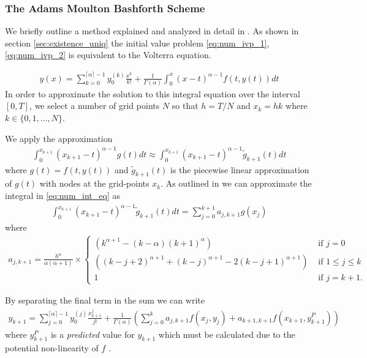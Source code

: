 \subsubsection{The Adams Moulton Bashforth Scheme}
\label{sec:amb_desc}
We briefly outline a method explained and analyzed in detail in \cite{Diethelm2004}. As shown in section \ref{sec:existence_uniq} the initial value problem \eqref{eq:num_ivp_1}, \eqref{eq:num_ivp_2} is equivalent to the Volterra equation.

\begin{align}
    \label{eq:num_int_eq}
    y(x) = \sum_{k=0}^{\lceil \alpha \rceil - 1} y_{0}^{(k)} \frac{x^k}{k!} + \frac{1}{\Gamma(\alpha)} \int_0^x (x-t)^{\alpha - 1} f(t, y(t))dt
\end{align}
In order to approximate the solution to this integral equation over the interval $ [0, T] $, we select a number of grid points $ N $ so that $ h = T / N $ and $ x_k = hk $ where $ k \in \{0, 1, ..., N\} $.

We apply the approximation
\begin{align}
    \int_0^{x_{k+1}} (x_{k+1} - t)^{\alpha - 1} g(t)dt \approx \int_0^{x_{k+1}} (x_{k+1} - t)^{\alpha - 1} \tilde{g}_{k+1}(t)dt
\end{align}
where $ g(t) = f(t, y(t)) $ and $ \tilde{g}_{k+1}(t) $ is the piecewise linear approximation of $ g(t) $ with nodes at the grid-points $ x_k $. As outlined in \cite{Diethelm2004} we can approximate the integral in \eqref{eq:num_int_eq} as
\begin{align}
    \label{eq:amb_sum_1}
    \int_{0}^{x_{k+1}} (x_{k+1} - t)^{\alpha - 1} \tilde{g}_{k+1}(t) dt = \sum_{j=0}^{k+1} a_{j,k+1}g(x_j)
\end{align}
where 
\begin{align}
    a_{j,k+1} = \frac{h^\alpha}{\alpha(\alpha+1)} \times
    \begin{cases}
        (k^{\alpha+1}-(k-\alpha)(k+1)^\alpha) & \text{ if } j = 0 \\
        ((k-j+2)^{\alpha + 1} + (k-j)^{\alpha+1} - 2(k-j+1)^{\alpha+1}) & \text{ if } 1 \leq j \leq k \\
        1 & \text{ if } j = k + 1.
    \end{cases}
\end{align}

By separating the final term in the sum we can write
\begin{align}
\label{eq:amb_y_corr}
    y_{k+1} = \sum_{j=0}^{\lceil \alpha \rceil - 1} y_{0}^{(j)} \frac{x^j_{k+1}}{j!} + \frac{1}{\Gamma(\alpha)} \left( \sum_{j=0}^k a_{j,k+1} f(x_j,y_j) + a_{k+1,k+1}f(x_{k+1}, y_{k+1}^P )\right)
\end{align}
where $ y_{k+1}^P $ is a \emph{predicted} value for $ y_{k+1} $ which must be calculated due to the potential non-linearity of $ f $ \cite{Diethelm2004}.

